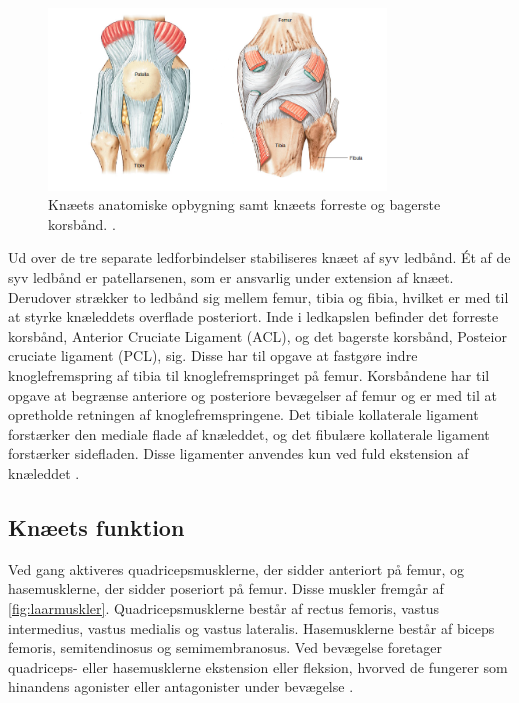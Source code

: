 \begin{figure}[H]
\centering
\includegraphics[width=0.8\textwidth]{figures/knae_anatomi}
\caption{Knæets anatomiske opbygning samt knæets forreste og bagerste korsbånd. \citep{aaos2014}.}
\label{fig:knae_anatomi}
\end{figure} 

\noindent
Ud over de tre separate ledforbindelser stabiliseres knæet af syv ledbånd. Ét af de syv ledbånd er patellarsenen, som er ansvarlig under extension af knæet. Derudover strækker to ledbånd sig mellem femur, tibia og fibia, hvilket er med til at styrke knæleddets overflade posteriort. 
Inde i ledkapslen befinder det forreste korsbånd, Anterior Cruciate Ligament (ACL), og det bagerste korsbånd, Posteior cruciate ligament (PCL), sig. Disse har til opgave at fastgøre indre knoglefremspring af tibia til knoglefremspringet på femur. 
Korsbåndene har til opgave at begrænse anteriore og posteriore bevægelser af femur og er med til at opretholde retningen af knoglefremspringene. 
Det tibiale kollaterale ligament forstærker den mediale flade af knæleddet, og det fibulære kollaterale ligament forstærker sidefladen. Disse ligamenter anvendes kun ved fuld ekstension af knæleddet \citep{martini2012}.

\subsection{Knæets funktion}
Ved gang aktiveres quadricepsmusklerne, der sidder anteriort på femur, og hasemusklerne, der sidder poseriort på femur. Disse muskler fremgår af \autoref{fig:laarmuskler}. Quadricepsmusklerne består af rectus femoris, vastus intermedius, vastus medialis og vastus lateralis. 
Hasemusklerne består af biceps femoris, semitendinosus og semimembranosus. 
Ved bevægelse foretager quadriceps- eller hasemusklerne ekstension eller fleksion, hvorved de fungerer som hinandens agonister eller antagonister under bevægelse \citep{martini2012}. 

